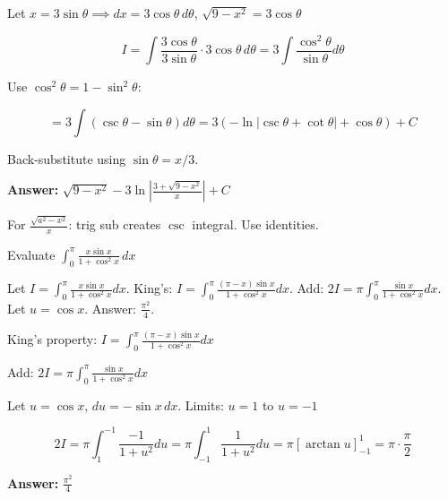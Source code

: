 \begin{solution}
Let $x=3\sin\theta \implies dx=3\cos\theta\,d\theta$, $\sqrt{9-x^2}=3\cos\theta$

\[
I = \int\frac{3\cos\theta}{3\sin\theta} \cdot 3\cos\theta\,d\theta = 3\int\frac{\cos^2\theta}{\sin\theta}d\theta
\]

Use $\cos^2\theta = 1-\sin^2\theta$:

\[
= 3\int(\csc\theta - \sin\theta)d\theta = 3(-\ln|\csc\theta+\cot\theta| + \cos\theta) + C
\]

Back-substitute using $\sin\theta = x/3$.

\textbf{Answer:} $\boxed{\sqrt{9-x^2} - 3\ln\left|\frac{3+\sqrt{9-x^2}}{x}\right| + C}$
\end{solution}

\begin{takeaways}
For $\frac{\sqrt{a^2-x^2}}{x}$: trig sub creates $\csc$ integral. Use identities.
\end{takeaways}

\vspace{1cm}

\begin{problem}
Evaluate $\displaystyle \int_0^{\pi} \frac{x \sin x}{1 + \cos^2 x} \, dx$
\end{problem}

\begin{hint}
Let $I = \int_0^{\pi} \frac{x\sin x}{1+\cos^2 x}dx$. King's: $I = \int_0^{\pi} \frac{(\pi-x)\sin x}{1+\cos^2 x}dx$. Add: $2I = \pi\int_0^{\pi}\frac{\sin x}{1+\cos^2 x}dx$. Let $u = \cos x$. Answer: $\frac{\pi^2}{4}$.
\end{hint}

\begin{solution}
King's property: $I = \int_0^{\pi}\frac{(\pi-x)\sin x}{1+\cos^2 x}dx$

Add: $2I = \pi\int_0^{\pi}\frac{\sin x}{1+\cos^2 x}dx$

Let $u=\cos x$, $du=-\sin x\,dx$. Limits: $u=1$ to $u=-1$

\[
2I = \pi\int_1^{-1}\frac{-1}{1+u^2}du = \pi\int_{-1}^1\frac{1}{1+u^2}du = \pi[\arctan u]_{-1}^1 = \pi\cdot\frac{\pi}{2}
\]

\textbf{Answer:} $\boxed{\frac{\pi^2}{4}}$
\end{solution}

